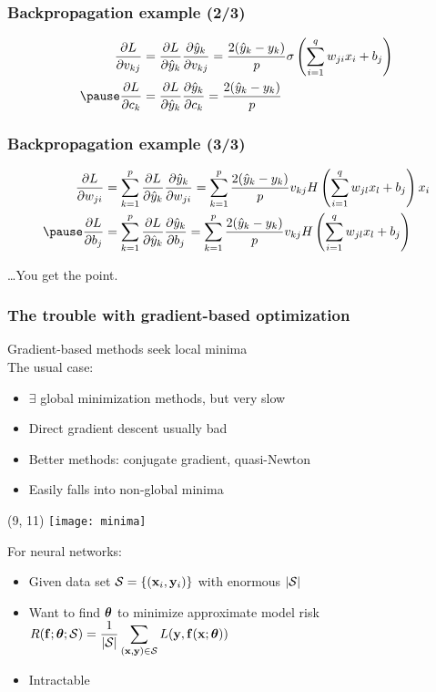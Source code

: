 \begin{frame}[t]
    \frametitle{Backpropagation example (2/3)}
    \mlpblock
    \pause

    \begin{align*}
        \p{L}{v_{kj}} &= \p{L}{\hat{y}_k} \p{\hat{y}_k}{v_{kj}}
        = \frac{2 (\hat{y}_k - y_k)}{p} \sigma\left(\sum_{i=1}^q w_{ji} x_i + b_j\right) \\
        \pause
        \p{L}{c_k} &= \p{L}{\hat{y}_k} \p{\hat{y}_k}{c_k}
        = \frac{2 (\hat{y}_k - y_k)}{p}
    \end{align*}
\end{frame}

\begin{frame}[t]
    \frametitle{Backpropagation example (3/3)}
    \mlpblock
    \pause

    \begin{align*}
        \p{L}{w_{ji}} &= \sum_{k=1}^p \p{L}{\hat{y}_k} \p{\hat{y}_k}{w_{ji}}
        = \sum_{k=1}^p \frac{2 (\hat{y}_k - y_k)}{p} v_{kj} H\left(\sum_{i=1}^q w_{jl} x_l + b_j\right) x_i \\
        \pause
        \p{L}{b_j} &= \sum_{k=1}^p \p{L}{\hat{y}_k} \p{\hat{y}_k}{b_j}
        = \sum_{k=1}^p \frac{2 (\hat{y}_k - y_k)}{p} v_{kj} H\left(\sum_{i=1}^q w_{jl} x_l + b_j\right)
    \end{align*}

    \ldots You get the point.
\end{frame}

\begin{frame}[t]
    \frametitle{The trouble with gradient-based optimization}

    Gradient-based methods \citep{PressNR} seek local minima \\[1ex]

    The usual case:
    \begin{itemize}
        \item $\exists$ global minimization methods, but very slow
        \item Direct gradient descent usually bad
        \item Better methods: conjugate gradient, quasi-Newton
        \item \alert{Easily falls into non-global minima}
    \end{itemize}

    \begin{textblock}{6}(9, 11)
        \texttt{[image: minima]}
    \end{textblock}

    \pause

    For neural networks:
    \begin{itemize}
        \item Given data set $\S = \{(\x_i, \y_i)\}$ with enormous $|\S|$
        \item Want to find $\THETA$ to minimize approximate model risk $\displaystyle R(\f; \THETA; \S) = \frac{1}{|\S|} \sum_{(\x, \y) \in \S} L(\y, \f(\x; \THETA))$
        \item \alert{Intractable}
    \end{itemize}
\end{frame}

